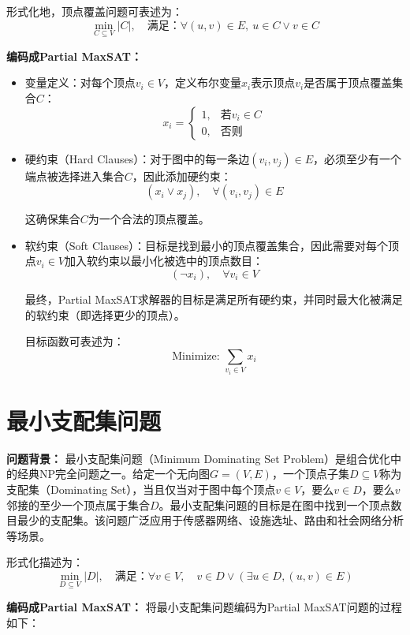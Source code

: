 \documentclass{article}
\begin{document}
形式化地，顶点覆盖问题可表述为：
\[
\min_{C \subseteq V} |C|,\quad \text{满足：}\forall (u,v)\in E,\ u \in C\vee v \in C
\]


\textbf{编码成Partial MaxSAT：}
\begin{itemize}
    \item 变量定义：对每个顶点$v_i\in V$，定义布尔变量$x_i$表示顶点$v_i$是否属于顶点覆盖集合$C$：
    \[
    x_i =
    \begin{cases}
    1, & \text{若$v_i\in C$}\\[4pt]
    0, & \text{否则}
    \end{cases}
    \]

    \item 硬约束（Hard Clauses）：对于图中的每一条边$(v_i,v_j)\in E$，必须至少有一个端点被选择进入集合$C$，因此添加硬约束：
    \[
    (x_i \vee x_j),\quad \forall (v_i,v_j)\in E
    \]

    这确保集合$C$为一个合法的顶点覆盖。

    \item 软约束（Soft Clauses）：目标是找到最小的顶点覆盖集合，因此需要对每个顶点$v_i\in V$加入软约束以最小化被选中的顶点数目：
    \[
    (\neg x_i),\quad \forall v_i\in V
    \]

    最终，Partial MaxSAT求解器的目标是满足所有硬约束，并同时最大化被满足的软约束（即选择更少的顶点）。

    目标函数可表述为：
    \[
    \text{Minimize: } \sum_{v_i\in V} x_i
    \]

\end{itemize}


\newpage
\section*{最小支配集问题}
\textbf{问题背景：}
最小支配集问题（Minimum Dominating Set Problem）是组合优化中的经典NP完全问题之一。给定一个无向图$G=(V,E)$，一个顶点子集$D \subseteq V$称为支配集（Dominating Set），当且仅当对于图中每个顶点$v\in V$，要么$v\in D$，要么$v$邻接的至少一个顶点属于集合$D$。最小支配集问题的目标是在图中找到一个顶点数目最少的支配集。该问题广泛应用于传感器网络、设施选址、路由和社会网络分析等场景。

形式化描述为：
\[
\min_{D \subseteq V} |D|,\quad\text{满足：}\forall v\in V,\quad v\in D \vee (\exists u\in D, (u,v)\in E)
\]

\textbf{编码成Partial MaxSAT：}
将最小支配集问题编码为Partial MaxSAT问题的过程如下：
\end{document}
